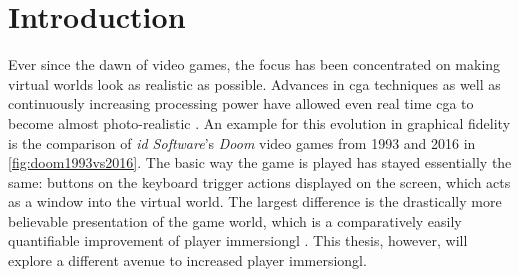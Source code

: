 
\chapter{Introduction}\label{chapter:Introduction}

Ever since the dawn of video games, the focus has been concentrated on making virtual worlds look as realistic as possible. Advances in \gls{cga} techniques as well as continuously increasing processing power have allowed even real time \gls{cga} to become almost photo-realistic \autocite{photorealismRealtime}.
\newline
An example for this evolution in graphical fidelity is the comparison of \textit{id Software}'s \textit{Doom} video games from 1993 and 2016 in \autoref{fig:doom1993vs2016}. The basic way the game is played has stayed essentially the same: buttons on the keyboard trigger actions displayed on the screen, which acts as a window into the virtual world. The largest difference is the drastically more believable presentation of the game world, which is a comparatively easily quantifiable improvement of player \gls{immersiongl} \autocite{gameImmersion}. This thesis, however, will explore a different avenue to increased player \gls{immersiongl}.

